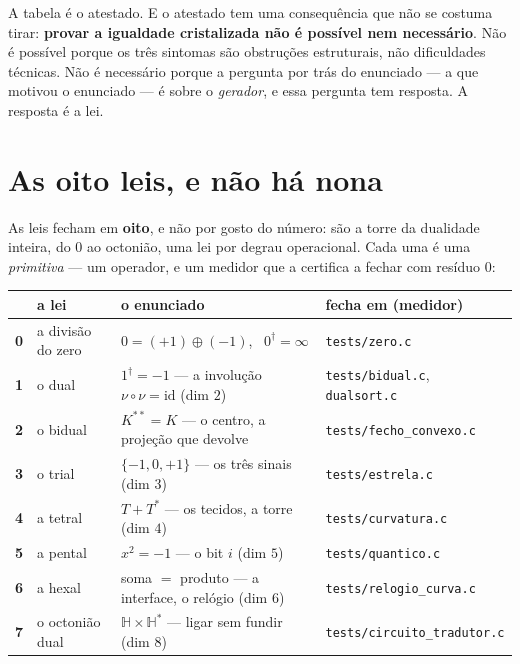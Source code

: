 \documentclass[11pt,a4paper]{article}
\newcommand{\code}[1]{\texttt{\small #1}}
\newcommand{\dg}{^{\dagger}}
\begin{document}
\noindent A tabela é o atestado. E o atestado tem uma consequência que não se costuma tirar:
\textbf{provar a igualdade cristalizada não é possível nem necessário}. Não é possível porque os três
sintomas são obstruções estruturais, não dificuldades técnicas. Não é necessário porque a pergunta
por trás do enunciado --- a que motivou o enunciado --- é sobre o \emph{gerador}, e essa pergunta tem
resposta. A resposta é a lei.

\section{As oito leis, e não há nona}\label{sec:leis}

As leis fecham em \textbf{oito}, e não por gosto do número: são a torre da dualidade inteira, do $0$
ao octonião, uma lei por degrau operacional. Cada uma é uma \emph{primitiva} --- um operador, e um
medidor que a certifica a fechar com resíduo $0$:

\begin{center}\small
\renewcommand{\arraystretch}{1.2}
\begin{tabular}{@{}clll@{}}
\toprule
 & a lei & o enunciado & fecha em (medidor) \\
\midrule
\textbf{0} & a divisão do zero & $0=(+1)\oplus(-1)$, \ $0\dg=\infty$ & \code{tests/zero.c} \\
\textbf{1} & o dual & $1\dg=-1$ --- a involução $\nu\circ\nu=\mathrm{id}$ (dim $2$) & \code{tests/bidual.c}, \code{dualsort.c} \\
\textbf{2} & o bidual & $K^{**}=K$ --- o centro, a projeção que devolve & \code{tests/fecho\_convexo.c} \\
\textbf{3} & o trial & $\{-1,0,+1\}$ --- os três sinais (dim $3$) & \code{tests/estrela.c} \\
\textbf{4} & a tetral & $T+T^{*}$ --- os tecidos, a torre (dim $4$) & \code{tests/curvatura.c} \\
\textbf{5} & a pental & $x^{2}=-1$ --- o bit $i$ (dim $5$) & \code{tests/quantico.c} \\
\textbf{6} & a hexal & soma $=$ produto --- a interface, o relógio (dim $6$) & \code{tests/relogio\_curva.c} \\
\textbf{7} & o octonião dual & $\mathbb{H}\times\mathbb{H}^{*}$ --- ligar sem fundir (dim $8$) & \code{tests/circuito\_tradutor.c} \\
\bottomrule
\end{tabular}
\end{center}
\end{document}

